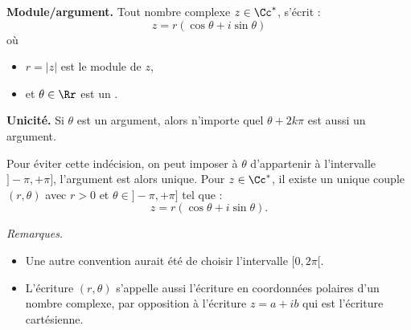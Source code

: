 \documentclass[11pt,class=report,crop=false]{standalone}
\begin{document}




\begin{cours}


\textbf{Module/argument.}
Tout nombre complexe $z \in \Cc^{\ast}$, s'écrit :
$$z = r \left( \cos \theta +  i \sin \theta \right)$$
où 
\begin{itemize}
  \item $r = \left| z \right|$ est le module de $z$,
  \item et $\theta \in \Rr$ est un .%
\end{itemize}




\medskip
\textbf{Unicité.}
Si $\theta$ est un argument, alors n'importe quel $\theta + 2k\pi$ est aussi un argument.

Pour éviter cette indécision, on peut imposer à $\theta$ d'appartenir à l'intervalle $]-\pi,+\pi]$, l'argument est alors unique. 
Pour $z \in \Cc^*$, il existe un unique couple $(r,\theta)$ avec $r>0$ et $\theta \in ]-\pi,+\pi]$ tel que :
$$z = r \left( \cos \theta +  i \sin \theta \right).$$


\emph{Remarques.}
\begin{itemize} 
  \item Une autre convention aurait été de choisir l'intervalle $[0,2\pi[$. 
  \item L'écriture $(r,\theta)$ s'appelle aussi l'écriture en coordonnées polaires d'un nombre complexe, par opposition à l'écriture $z=a+ib$ qui est l'écriture cartésienne.
\end{itemize}

\end{cours}


\end{document}
